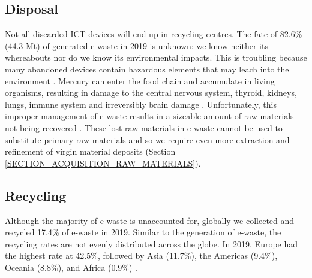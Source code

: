 \documentclass{article}
\begin{document}
\subsection{Disposal}
Not all discarded ICT devices will end up in recycling centres. The fate of 82.6\% (44.3 Mt) of generated e-waste in 2019 is unknown: we know neither its whereabouts nor do we know its environmental impacts. This is troubling because many abandoned devices contain hazardous elements that may leach into the environment \cite{forti2020global}. Mercury can enter the food chain and accumulate in living organisms, resulting in damage to the central nervous system, thyroid, kidneys, lungs, immune system and irreversibly brain damage \cite{balde2018waste}. Unfortunately, this improper management of e-waste results in a sizeable amount of raw materials not being recovered \cite{forti2020global}. These lost raw materials in e-waste cannot be used to substitute primary raw materials and so we require even more extraction and refinement of virgin material deposits (Section \ref{SECTION_ACQUISITION_RAW_MATERIALS}).


\subsection{Recycling}
Although the majority of e-waste is unaccounted for, globally we collected and recycled 17.4\% of e-waste in 2019. Similar to the generation of e-waste, the recycling rates are not evenly distributed across the globe. In 2019, Europe had the highest rate at 42.5\%, followed by Asia (11.7\%), the Americas (9.4\%), Oceania (8.8\%), and Africa (0.9\%) \cite{forti2020global}.

\end{document}
